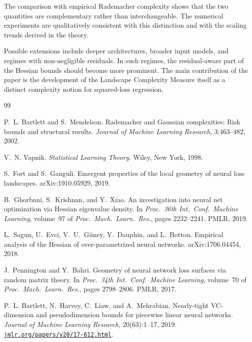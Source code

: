\documentclass[10pt,letterpaper]{article}
\theoremstyle{definition}
\begin{document}
The comparison with empirical Rademacher complexity shows that the two quantities are complementary rather than interchangeable. The numerical experiments are qualitatively consistent with this distinction and with the scaling trends derived in the theory.

Possible extensions include deeper architectures, broader input models, and regimes with non-negligible residuals. In such regimes, the residual-aware part of the Hessian bounds should become more prominent. The main contribution of the paper is the development of the Landscape Complexity Measure itself as a distinct complexity notion for squared-loss regression.

\begin{thebibliography}{99}

P.~L. Bartlett and S.~Mendelson.
\newblock Rademacher and Gaussian complexities: Risk bounds and structural results.
\newblock \emph{Journal of Machine Learning Research}, 3:463--482, 2002.

V.~N. Vapnik.
\newblock \emph{Statistical Learning Theory}.
\newblock Wiley, New York, 1998.

S.~Fort and S.~Ganguli.
\newblock Emergent properties of the local geometry of neural loss landscapes.
\newblock arXiv:1910.05929, 2019.

B.~Ghorbani, S.~Krishnan, and Y.~Xiao.
\newblock An investigation into neural net optimization via Hessian eigenvalue density.
\newblock In \emph{Proc.\ 36th Int.\ Conf.\ Machine Learning}, volume~97 of \emph{Proc.\ Mach.\ Learn.\ Res.}, pages 2232--2241. PMLR, 2019.

L.~Sagun, U.~Evci, V.~U.~G{\"u}ney, Y.~Dauphin, and L.~Bottou.
\newblock Empirical analysis of the Hessian of over-parametrized neural networks.
\newblock arXiv:1706.04454, 2018.

J.~Pennington and Y.~Bahri.
\newblock Geometry of neural network loss surfaces via random matrix theory.
\newblock In \emph{Proc.\ 34th Int.\ Conf.\ Machine Learning}, volume~70 of \emph{Proc.\ Mach.\ Learn.\ Res.}, pages 2798--2806. PMLR, 2017.

P.~L. Bartlett, N.~Harvey, C.~Liaw, and A.~Mehrabian.
\newblock Nearly-tight VC-dimension and pseudodimension bounds for piecewise linear neural networks.
\newblock \emph{Journal of Machine Learning Research}, 20(63):1--17, 2019.
\newblock \href{https://jmlr.org/papers/v20/17-612.html}{\texttt{jmlr.org/papers/v20/17-612.html}}.


\end{thebibliography}
\end{document}
